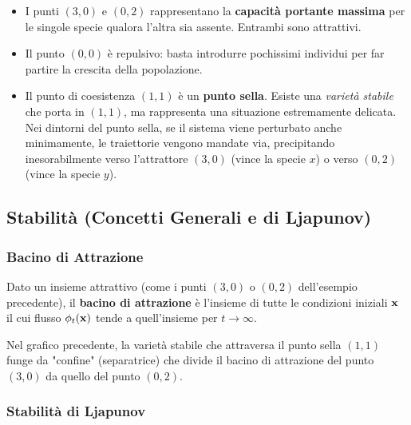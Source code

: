 \documentclass[openany]{book}
\theoremstyle{definition}
\theoremstyle{remark}
\begin{document}
\begin{itemize}
    \item I punti $(3,0)$ e $(0,2)$ rappresentano la \textbf{capacità portante massima} per le singole specie qualora l'altra sia assente. Entrambi sono attrattivi.
    \item Il punto $(0,0)$ è repulsivo: basta introdurre pochissimi individui per far partire la crescita della popolazione.
    \item Il punto di coesistenza $(1,1)$ è un \textbf{punto sella}. Esiste una \textit{varietà stabile} che porta in $(1,1)$, ma rappresenta una situazione estremamente delicata. Nei dintorni del punto sella, se il sistema viene perturbato anche minimamente, le traiettorie vengono mandate via, precipitando inesorabilmente verso l'attrattore $(3,0)$ (vince la specie $x$) o verso $(0,2)$ (vince la specie $y$).
\end{itemize}


\subsection{Stabilità (Concetti Generali e di Ljapunov)}


\subsubsection*{Bacino di Attrazione}
Dato un insieme attrattivo (come i punti $(3,0)$ o $(0,2)$ dell'esempio precedente), il \textbf{bacino di attrazione} è l'insieme di tutte le condizioni iniziali $\vb{x}$ il cui flusso $\phi_t(\vb{x})$ tende a quell'insieme per $t \to \infty$. 

Nel grafico precedente, la varietà stabile che attraversa il punto sella $(1,1)$ funge da "confine" (separatrice) che divide il bacino di attrazione del punto $(3,0)$ da quello del punto $(0,2)$.

\subsubsection*{Stabilità di Ljapunov}
\begin{figure}[H]
\centering
{}
\end{figure}
\end{document}
